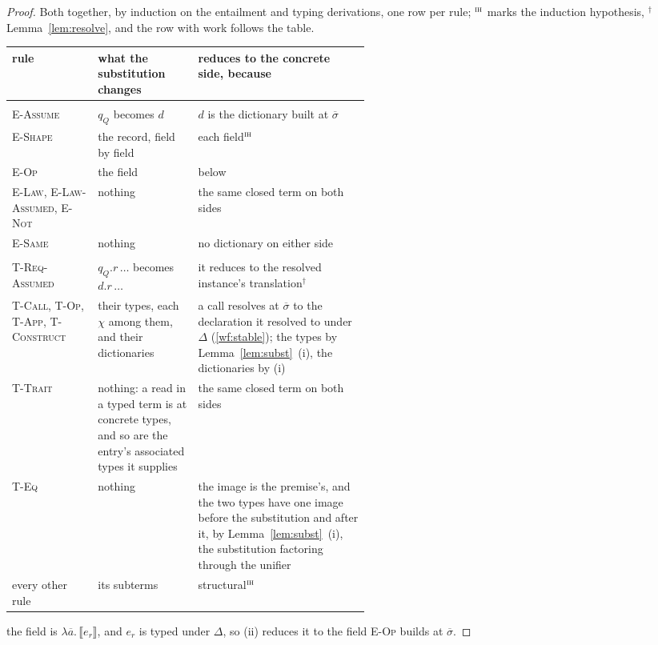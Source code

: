 \begin{proof}
Both together, by induction on the entailment and typing derivations, one row per rule; ${}^{\textsc{ih}}$ marks the induction hypothesis, ${}^{\dagger}$ Lemma~\ref{lem:resolve}, and the row with work follows the table.
\begingroup
\small
\begin{longtable}{@{}>{\raggedright\arraybackslash}p{0.24\linewidth}>{\raggedright\arraybackslash}p{0.28\linewidth}>{\raggedright\arraybackslash}p{}@{}}
\toprule
rule & what the substitution changes & reduces to the concrete side, because \\
\midrule
\endhead
\bottomrule
\endlastfoot
\multicolumn{3}{@{}l}{\textit{(i), dictionaries}} \\
\textsc{E-Assume} & $q_Q$ becomes $d$ & $d$ is the dictionary built at $\overline{\sigma}$ \\
\textsc{E-Shape} & the record, field by field & each field${}^{\textsc{ih}}$ \\
\textsc{E-Op} & the field & below \\
\textsc{E-Law}, \textsc{E-Law-Assumed}, \textsc{E-Not} & nothing & the same closed term on both sides \\
\textsc{E-Same} & nothing & no dictionary on either side \\
\multicolumn{3}{@{}l}{\textit{(ii), terms}} \\
\textsc{T-Req-Assumed} & $q_Q.r\,\ldots$ becomes $d.r\,\ldots$ & it reduces to the resolved instance's translation${}^{\dagger}$ \\
\textsc{T-Call}, \textsc{T-Op}, \textsc{T-App}, \textsc{T-Construct} & their types, each $\chi$ among them, and their dictionaries & a call resolves at $\overline{\sigma}$ to the declaration it resolved to under $\Delta$ (\ref{wf:stable}); the types by Lemma~\ref{lem:subst}~(i), the dictionaries by (i) \\
\textsc{T-Trait} & nothing: a read in a typed term is at concrete types, and so are the entry's associated types it supplies & the same closed term on both sides \\
\textsc{T-Eq} & nothing & the image is the premise's, and the two types have one image before the substitution and after it, by Lemma~\ref{lem:subst}~(i), the substitution factoring through the unifier \\
every other rule & its subterms & structural${}^{\textsc{ih}}$ \\
\end{longtable}
\addtocounter{table}{-1}
\endgroup
{}the field is $\lambda\overline{a}.\,\llbracket e_r \rrbracket$, and $e_r$ is typed under $\Delta$, so (ii) reduces it to the field \textsc{E-Op} builds at $\overline{\sigma}$.
\end{proof}

